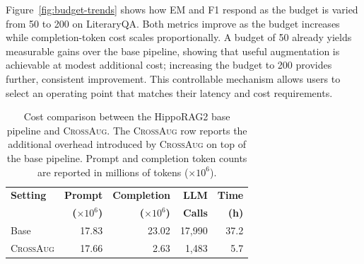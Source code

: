 \documentclass[11pt]{article}
\newcommand{\ours}{\textsc{CrossAug}\xspace}
\begin{document}
Figure~\ref{fig:budget-trends} shows how EM and F1 respond as the budget is varied from 50 to 200 on LiteraryQA. Both metrics improve as the budget increases while completion-token cost scales proportionally. A budget of 50 already yields measurable gains over the base pipeline, showing that useful augmentation is achievable at modest additional cost; increasing the budget to 200 provides further, consistent improvement. This controllable mechanism allows users to select an operating point that matches their latency and cost requirements.

\begin{table}[!htbp]
\centering
\small
\setlength{\tabcolsep}{3pt}
\begin{tabular}{@{}lrrrr@{}}
\toprule
\textbf{Setting} & \textbf{Prompt} & \textbf{Completion} & \textbf{LLM} & \textbf{Time} \\
 & \textbf{($\times 10^6$)} & \textbf{($\times 10^6$)} & \textbf{Calls} & \textbf{(h)} \\
\midrule
Base & 17.83 & 23.02 & 17,990 & 37.2 \\
\ours & 17.66 & 2.63 & 1,483 & 5.7 \\
\bottomrule
\end{tabular}
\caption{Cost comparison between the HippoRAG2 base pipeline and \ours. The \ours row reports the additional overhead introduced by \ours on top of the base pipeline. Prompt and completion token counts are reported in millions of tokens ($\times 10^6$).}
\label{tab:cost-efficiency}
\end{table}
\end{document}
